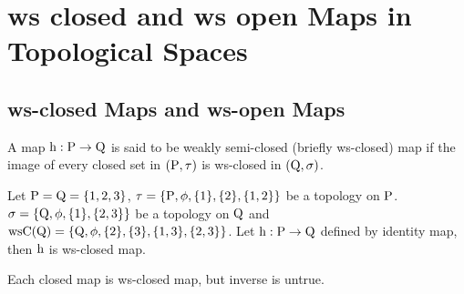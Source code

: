 \chapter{ws closed and ws open Maps in Topological Spaces}
\graphicspath{{Chapter4/Chapter4Figs/EPS/}{Chapter4/Chapter4Figs/}}




\section{ws-closed Maps and ws-open Maps}\label{sec4.2}

\begin{dfn}\label{defi4.2.1} 
A map $\mathrm{h}: \mathrm{P} \to \mathrm{Q}$ is said to be weakly semi-closed (briefly ws-closed) map if the image of every closed set in $(\mathrm{P}, \tau)$ is ws-closed in $(\mathrm{Q}, \sigma)$.
\end{dfn}

\begin{exm}\label{exam4.2.2}
Let $\mathrm{P} = \mathrm{Q} = \{1, 2, 3\}$, $\tau = \{\mathrm{P}, \phi, \{1\}, \{2\}, \{1, 2\}\}$ be a topology on $\mathrm{P}$.
$\sigma = \{\mathrm{Q}, \phi, \{1\}, \{2, 3\}\}$ be a topology on $\mathrm{Q}$ and $\ws\TSC(\TSQ) =\{\TSQ, \phi, \{2\},\{3\},\{1,3\},\break \{2, 3\}\}$. Let $\mathrm{h}: \mathrm{P} \to \mathrm{Q}$ defined by identity map, then $\mathrm{h}$ is ws-closed map.
\end{exm}

\begin{thm}\label{thm4.2.3}
Each closed map is ws-closed map, but inverse is untrue.
\end{thm}

